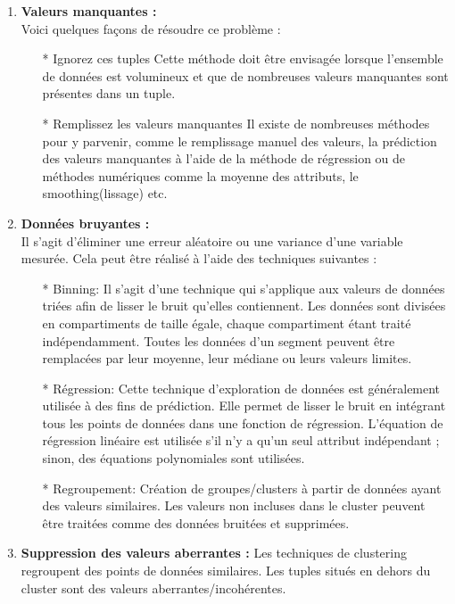 \documentclass[a4paper, 12pt]{article}
\begin{document}
	\begin{enumerate}
		\item \textbf{Valeurs manquantes :}\\Voici quelques façons de résoudre ce problème :
		\begin{itemize}
			\item[*] Ignorez ces tuples
			Cette méthode doit être envisagée lorsque l’ensemble de données est volumineux et que de nombreuses valeurs manquantes sont présentes dans un tuple.
			\item[*]	Remplissez les valeurs manquantes 
			Il existe de nombreuses méthodes pour y parvenir, comme le remplissage manuel des valeurs, la prédiction des valeurs manquantes à l'aide de la méthode de régression ou de méthodes numériques comme la moyenne des attributs, le smoothing(lissage) etc.
		\end{itemize}
		\item \textbf{Données bruyantes :}\\ Il s'agit d'éliminer une erreur aléatoire ou une variance d'une variable mesurée. Cela peut être réalisé à l'aide des techniques suivantes :
			\begin{itemize}
				\item[*] Binning: Il s'agit d'une technique qui s'applique aux valeurs de données triées afin de lisser le bruit qu'elles contiennent. Les données sont divisées en compartiments de taille égale, chaque compartiment étant traité indépendamment. Toutes les données d'un segment peuvent être remplacées par leur moyenne, leur médiane ou leurs valeurs limites.
				\item[*] 	Régression: Cette technique d'exploration de données est généralement utilisée à des fins de prédiction. Elle permet de lisser le bruit en intégrant tous les points de données dans une fonction de régression. L'équation de régression linéaire est utilisée s'il n'y a qu'un seul attribut indépendant ; sinon, des équations polynomiales sont utilisées.
				\item[*] Regroupement: Création de groupes/clusters à partir de données ayant des valeurs similaires. Les valeurs non incluses dans le cluster peuvent être traitées comme des données bruitées et supprimées.
			\end{itemize}
		\item \textbf{ Suppression des valeurs aberrantes :} Les techniques de clustering regroupent des points de données similaires. Les tuples situés en dehors du cluster sont des valeurs aberrantes/incohérentes.
	\end{enumerate}
		
\end{document}
